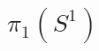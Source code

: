 \documentclass[hott-all.tex]{subfiles}
\begin{document}
% 
% 
% 
\section{\texorpdfstring{$\pi_1(S^1)$}{π₁(S¹)}}
% 
% 
\end{document}

